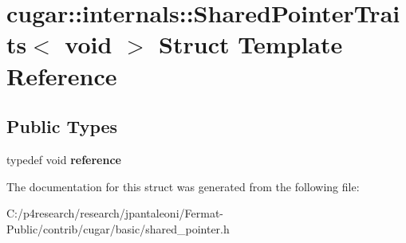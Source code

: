 \hypertarget{structcugar_1_1internals_1_1_shared_pointer_traits_3_01void_01_4}{}\section{cugar\+:\+:internals\+:\+:Shared\+Pointer\+Traits$<$ void $>$ Struct Template Reference}
\label{structcugar_1_1internals_1_1_shared_pointer_traits_3_01void_01_4}
\subsection*{Public Types}
\begin{DoxyCompactItemize}
\item 
\mbox{\label{structcugar_1_1internals_1_1_shared_pointer_traits_3_01void_01_4_a4943a6c0b537a94fcf5bece13004ab63}} 
typedef void {\bfseries reference}
\end{DoxyCompactItemize}


The documentation for this struct was generated from the following file\+:\begin{DoxyCompactItemize}
\item 
C\+:/p4research/research/jpantaleoni/\+Fermat-\/\+Public/contrib/cugar/basic/shared\+\_\+pointer.\+h\end{DoxyCompactItemize}
